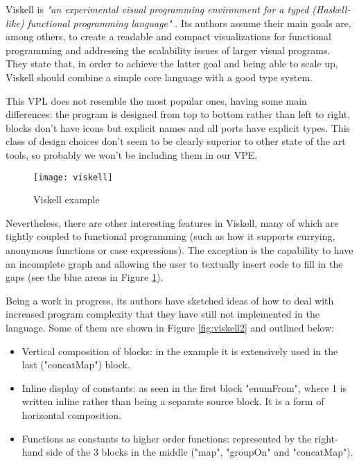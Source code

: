 \begin{itemsize}
Viskell is \textit{"an experimental visual programming environment for a typed
(Haskell-like) functional programming language"} \cite{viskell}. Its authors
assume their main goals are, among others, to create a readable and compact
visualizations for functional programming and addressing the scalability issues
of larger visual programs. They state that, in order to achieve the latter goal
and being able to scale up, Viskell should combine a simple core language with
a good type system.

This VPL does not resemble the most popular ones, having some main differences:
the program is designed from top to bottom rather than left to right, blocks
don't have icons but explicit names and all ports have explicit types. This class
of design choices don't seem to be clearly superior to other state of the art tools,
so probably we won't be including them in our VPE.

\begin{figure}[t]
  \begin{center}
    \leavevmode
    \texttt{[image: viskell]}
    \caption{Viskell example \cite{viskell}}
    \label{fig:viskell}
  \end{center}
\end{figure}

Nevertheless, there are other interesting features in Viskell, many of which
are tightly coupled to functional programming (such as how it supports currying,
anonymous functions or case expressions). The exception is the capability to
have an incomplete graph and allowing the user to textually insert code to fill
in the gaps (see the blue areas in Figure \ref{fig:viskell}).

Being a work in progress, its authors have sketched ideas of how to deal with
increased program complexity that they have still not implemented in the language.
Some of them are shown in Figure \ref{fig:viskell2} and outlined below:

\begin{itemize}
  \item Vertical composition of blocks: in the example it is extensively used
in the last ("concatMap") block.
  \item Inline display of constants: as seen in the first block "enumFrom",
where 1 is written inline rather than being a separate source block. It is a form
of horizontal composition.
  \item Functions as constants to higher order functions: represented by the
right-hand side of the 3 blocks in the middle ("map", "groupOn" and "concatMap").
\end{itemize}


\end{itemsize}
